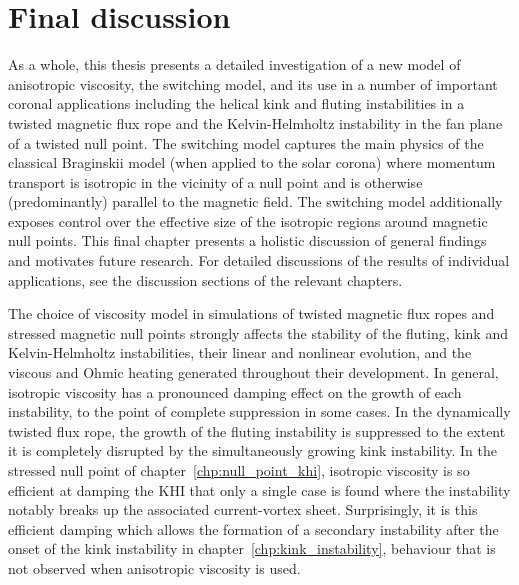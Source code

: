 \chapter{Final discussion}

\label{chp:summary}

As a whole, this thesis presents a detailed investigation of a new model of anisotropic viscosity, the switching model, and its use in a number of important coronal applications including the helical kink and fluting instabilities in a twisted magnetic flux rope and the Kelvin-Helmholtz instability in the fan plane of a twisted null point. The switching model captures the main physics of the classical Braginskii model (when applied to the solar corona) where momentum transport is isotropic in the vicinity of a null point and is otherwise (predominantly) parallel to the magnetic field. The switching model additionally exposes control over the effective size of the isotropic regions around magnetic null points. This final chapter presents a holistic discussion of general findings and motivates future research. For detailed discussions of the results of individual applications, see the discussion sections of the relevant chapters.

The choice of viscosity model in simulations of twisted magnetic flux ropes and stressed magnetic null points strongly affects the stability of the fluting, kink and Kelvin-Helmholtz instabilities, their linear and nonlinear evolution, and the viscous and Ohmic heating generated throughout their development. In general, isotropic viscosity has a pronounced damping effect on the growth of each instability, to the point of complete suppression in some cases. In the dynamically twisted flux rope, the growth of the fluting instability is suppressed to the extent it is completely disrupted by the simultaneously growing kink instability. In the stressed null point of chapter~\ref{chp:null_point_khi}, isotropic viscosity is so efficient at damping the KHI that only a single case is found where the instability notably breaks up the associated current-vortex sheet. Surprisingly, it is this efficient damping which allows the formation of a secondary instability after the onset of the kink instability in chapter~\ref{chp:kink_instability}, behaviour that is not observed when anisotropic viscosity is used.

